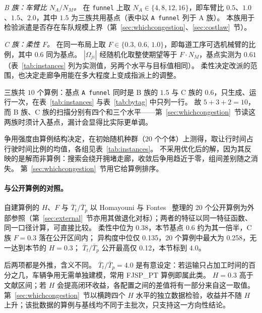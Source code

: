 \documentclass[manuscript,screen,review]{acmart}
\newcommand{\NCases}{10}
\newcommand{\PubFMed}{0.38}              %
\newcommand{\PubHMed}{0.135}             %
\newcommand{\PubHMax}{0.258}             %
\newcommand{\PubTtTpHi}{0.12}            %
\newcommand{\PubNInst}{20}
\begin{document}
\emph{B 族：车臂比 $N_A/N_M$。}
在 \texttt{funnel} 上取 $N_A\in\{4,8,12,16\}$，即车臂比 $0.5$、$1.0$、$1.5$、$2.0$，其中 $1.5$ 为三族共用基点（表中以 \texttt{A funnel} 列于 A 族）。
本族用于检验派遣是否存在车队规模上界（第~\ref{sec:whichcongestion}、\ref{sec:costlaw}~节）。

\emph{C 族：柔性 $F$。}
在同一布局上取 $F\in\{0.3,\,0.6,\,1.0\}$，即每道工序可选机械臂的比例，其中 $0.6$ 同为基点。
$|\Omega_{ji}|$ 经随机化取整使期望等于 $F\cdot N_M$，基点实测为 $0.61$（表~\ref{tab:instances} 列为实测值，另两个水平与目标值相同）。
柔性决定改派的范围，也决定走廊争用能在多大程度上变成指派上的调整。

三族共 $\NCases$ 个算例：基点 \texttt{A funnel} 同时是 B 族的 $1.5$ 与 C 族的 $0.6$，只生成、运行一次，在表~\ref{tab:instances} 与表~\ref{tab:bytag} 中只列一行。
故 $5+3+2=\NCases$，而 B 族、C 族的扫描分别有四个和三个水平——第~\ref{sec:whichcongestion}~节读这两族时须计入基点，漏计会显得比实际更单调。

争用强度由算例结构决定，在初始随机种群（$20$ 个个体）上测得，取让行时间占行驶时间比例的均值，各组见表~\ref{tab:instances}。
不采用优化后的解，因为其反映的是解而非算例：搜索会绕开拥堵走廊，收敛后争用趋近于零，组间差别随之消失。
第~\ref{sec:whichcongestion}~节用它给算例排序。

\paragraph{与公开算例的对照。}
自建算例的 $H$、$F$ 与 $\bar{T}_t/\bar{T}_p$ 以 Homayouni 与 Fontes~\cite{homayouni2021production} 整理的 \PubNInst{} 个公开算例为外部参照（第~\ref{sec:external}~节亦用其做退化对标）；两者的特征以同一特征函数、同一口径计算，可直接比较。
柔性中位为 \PubFMed{}，本节基点 $0.6$ 约为其一倍半，C 族 $F=0.3$ 落在公开区间内；
异构度中位仅 \PubHMed{}，\PubNInst{} 个算例中最大为 \PubHMax{}，无一达到本节的 $H=0.3$；
$\bar{T}_t/\bar{T}_p$ 公开最高仅 \PubTtTpHi{}，本节标到 $4.0$。

后两项都是外推，含义不同。
$\bar{T}_t/\bar{T}_p=4.0$ 是有意设定：若运输只占加工时间的百分之几，车辆争用无需单独建模，常用 FJSP\_PT 算例即属此类。
$H=0.3$ 高于文献区间；若 $H$ 会提高闭环收益，各配置之间的差值将有一部分来自这一取值。
第~\ref{sec:whichcongestion}~节以横跨四个 $H$ 水平的独立数据检验，收益并不随 $H$ 上升；该批数据的算例与基线均不同于主批次，只支持这一方向性结论。

\begin{table}[t]
\caption{受控算例。全部算例共用 $12$ 工件、$36$ 道真实工序、$8$ 台机械臂、$H=0.3$、
$\bar{T}_t/\bar{T}_p\approx4.0$；三族分别只变化布局、车臂比与柔性。争用强度为初始随机种群
上让行时间占行驶总时间的比例，由算例结构决定，不是输入参数。}
\label{tab:instances}
\small

\end{table}
\end{document}
